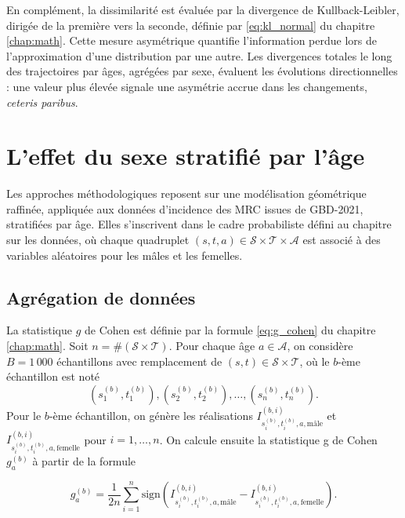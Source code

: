 En complément, la dissimilarité est évaluée par la divergence de Kullback-Leibler, dirigée de la première vers la seconde, définie par \eqref{eq:kl_normal} du chapitre \ref{chap:math}. Cette mesure asymétrique quantifie l'information perdue lors de l'approximation d'une distribution par une autre. Les divergences totales le long des trajectoires par âges, agrégées par sexe, évaluent les évolutions directionnelles : une valeur plus élevée signale une asymétrie accrue dans les changements, \emph{ceteris paribus}.

\section{L'effet du sexe stratifié par l'âge}

Les approches méthodologiques reposent sur une modélisation géométrique raffinée, appliquée aux données d'incidence des MRC issues de GBD-2021, stratifiées par âge. Elles s'inscrivent dans le cadre probabiliste défini au chapitre sur les données, où chaque quadruplet $(s,t,a) \in \mathcal{S} \times \mathcal{T} \times \mathcal{A}$ est associé à des variables aléatoires pour les mâles et les femelles.

\subsection{Agrégation de données}

La statistique $g$ de Cohen est définie par la formule \eqref{eq:g_cohen} du chapitre \ref{chap:math}. Soit $n = \# (\mathcal{S} \times \mathcal{T})$. Pour chaque âge $a \in \mathcal{A}$, on considère $B = 1\,000$ échantillons avec remplacement de $(s,t) \in \mathcal{S} \times \mathcal{T}$, où le $b$-ème échantillon est noté
\begin{equation}
(s_1^{(b)}, t_1^{(b)}), (s_2^{(b)}, t_2^{(b)}), \dots, (s_n^{(b)}, t_n^{(b)}).
\end{equation}
Pour le $b$-ème échantillon, on génère les réalisations $I_{s_i^{(b)}, t_i^{(b)}, a, \mathrm{mâle}}^{(b,i)}$ et $I_{s_i^{(b)}, t_i^{(b)}, a, \mathrm{femelle}}^{(b,i)}$ pour $i = 1, \dots, n$. On calcule ensuite la statistique g de Cohen $g_a^{(b)}$ à partir de la formule 

\begin{equation}
	g_a^{(b)} = \frac{1}{2n}\sum_{i=1}^n \mathrm{sign} \left(I_{s_i^{(b)}, t_i^{(b)}, a, \mathrm{mâle}}^{(b,i)} -
	I_{s_i^{(b)}, t_i^{(b)}, a, \mathrm{femelle}}^{(b,i)}
	 \right).
\end{equation}

